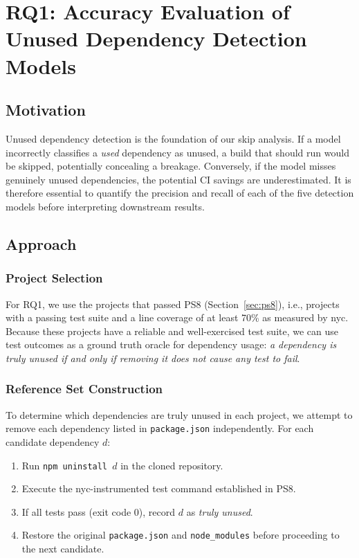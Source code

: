 \section{RQ1: Accuracy Evaluation of Unused Dependency Detection Models}
\label{sec:rq1}

\subsection{Motivation}

Unused dependency detection is the foundation of our skip analysis.
If a model incorrectly classifies a \emph{used} dependency as unused, a
build that should run would be skipped, potentially concealing a breakage.
Conversely, if the model misses genuinely unused dependencies, the potential
CI savings are underestimated.
It is therefore essential to quantify the precision and recall of each of
the five detection models before interpreting downstream results.

\subsection{Approach}

\subsubsection{Project Selection}

For RQ1, we use the projects that passed PS8 (Section~\ref{sec:ps8}),
i.e., projects with a passing test suite and a line coverage of at least
70\% as measured by nyc.
Because these projects have a reliable and well-exercised test suite, we
can use test outcomes as a ground truth oracle for dependency usage:
\emph{a dependency is truly unused if and only if removing it does not
cause any test to fail}.

\subsubsection{Reference Set Construction}
\label{sec:ref-set}

To determine which dependencies are truly unused in each project,
we attempt to remove each dependency listed in \texttt{package.json}
independently.
For each candidate dependency $d$:

\begin{enumerate}
  \item Run \texttt{npm uninstall $d$} in the cloned repository.
  \item Execute the nyc-instrumented test command established in PS8.
  \item If all tests pass (exit code 0), record $d$ as \emph{truly unused}.
  \item Restore the original \texttt{package.json} and
        \texttt{node\_modules} before proceeding to the next candidate.
\end{enumerate}

